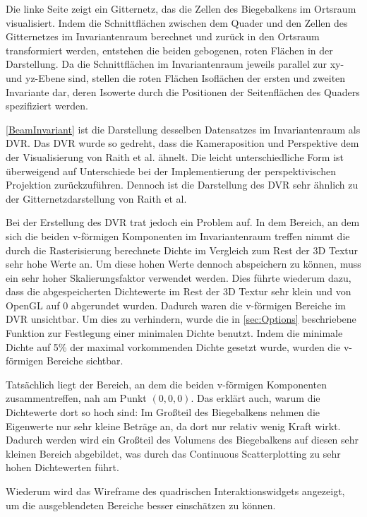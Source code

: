 \documentclass[a4paper,fontsize=12pt,toc=bib,halfparskip,ngerman]{scrartcl}
\begin{document}
Die linke Seite zeigt ein Gitternetz, das die Zellen des Biegebalkens im Ortsraum visualisiert. Indem die Schnittfl\"achen zwischen dem Quader und den Zellen des Gitternetzes im Invariantenraum berechnet und zur\"uck in den Ortsraum transformiert werden, entstehen die beiden gebogenen, roten Fl\"achen in der Darstellung. Da die Schnittfl\"achen im Invariantenraum jeweils parallel zur xy- und yz-Ebene sind, stellen die roten Fl\"achen Isofl\"achen der ersten und zweiten Invariante dar, deren Isowerte durch die Positionen der Seitenfl\"achen des Quaders spezifiziert werden.

\cref{BeamInvariant} ist die Darstellung desselben Datensatzes im Invariantenraum als DVR. Das DVR wurde so gedreht, dass die Kameraposition und Perspektive dem der Visualisierung von Raith et al. \"ahnelt. Die leicht unterschiedliche Form ist \"uberweigend auf Unterschiede bei der Implementierung der perspektivischen Projektion zur\"uckzuf\"uhren. Dennoch ist die Darstellung des DVR sehr \"ahnlich zu der Gitternetzdarstellung von Raith et al.

Bei der Erstellung des DVR trat jedoch ein Problem auf. In dem Bereich, an dem sich die beiden v-f\"ormigen Komponenten im Invariantenraum treffen nimmt die durch die Rasterisierung berechnete Dichte im Vergleich zum Rest der 3D Textur sehr hohe Werte an. Um diese hohen Werte dennoch abspeichern zu k\"onnen, muss ein sehr hoher Skalierungsfaktor verwendet werden. Dies f\"uhrte wiederum dazu, dass die abgespeicherten Dichtewerte im Rest der 3D Textur sehr klein und von OpenGL auf 0 abgerundet wurden. Dadurch waren die v-f\"ormigen Bereiche im DVR unsichtbar. Um dies zu verhindern, wurde die in \cref{sec:Options} beschriebene Funktion zur Festlegung einer minimalen Dichte benutzt. Indem die minimale Dichte auf 5\% der maximal vorkommenden Dichte gesetzt wurde, wurden die v-f\"ormigen Bereiche sichtbar.

Tats\"achlich liegt der Bereich, an dem die beiden v-f\"ormigen Komponenten zusammentreffen, nah am Punkt $(0,0,0)$. Das erkl\"art auch, warum die Dichtewerte dort so hoch sind: Im Gro{\ss}teil des Biegebalkens nehmen die Eigenwerte nur sehr kleine Betr\"age an, da dort nur relativ wenig Kraft wirkt. Dadurch werden wird ein Gro{\ss}teil des Volumens des Biegebalkens auf diesen sehr kleinen Bereich abgebildet, was durch das Continuous Scatterplotting zu sehr hohen Dichtewerten f\"uhrt.

Wiederum wird das Wireframe des quadrischen Interaktionswidgets angezeigt, um die ausgeblendeten Bereiche besser einsch\"atzen zu k\"onnen.
\end{document}
